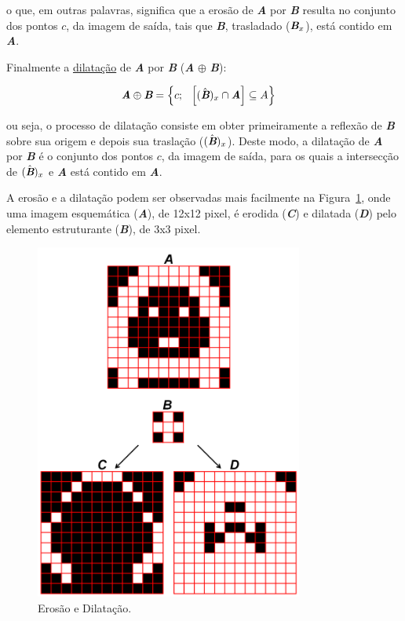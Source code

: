 o que, em outras palavras, significa que a erosão de
\textit{\textbf{A}} por \textit{\textbf{B}} resulta no conjunto dos
pontos $c$, da imagem de saída, tais que \textit{\textbf{B}},
trasladado ($\textit{\textbf{B}}_{x}$), está contido em
\textit{\textbf{A}}.

Finalmente a \underline{dilatação} de \textit{\textbf{A}} por
\textit{\textbf{B}} (\textit{\textbf{A}} $\oplus$
\textit{\textbf{B}}):

\begin{align}
 &\textit{\textbf{A}} \oplus \textit{\textbf{B}} = \left\lbrace \text{$c$; \: $\left[ (\hat{\textit{\textbf{B}}})_{x} \cap \textbf{\textit{A}} \right] \subseteq A$} \right\rbrace
\end{align}

ou seja, o processo de dilatação consiste em obter primeiramente a
reflexão de \textit{\textbf{B}} sobre sua origem e depois sua
traslação ($(\hat{\textit{\textbf{B}}})_{x}$). Deste modo, a dilatação
de \textit{\textbf{A}} por \textit{\textbf{B}} é o conjunto dos pontos
$c$, da imagem de saída, para os quais a intersecção de
$(\hat{\textit{\textbf{B}}})_{x}$ e \textit{\textbf{A}} está contido
em \textit{\textbf{A}}.

A erosão e a dilatação podem ser observadas mais facilmente na
Figura~\ref{fig:eroc-dilat}, onde uma imagem esquemática
(\textit{\textbf{A}}), de 12x12 pixel, é erodida (\textit{\textbf{C}})
e dilatada (\textit{\textbf{D}}) pelo elemento estruturante
(\textit{\textbf{B}}), de 3x3 pixel.

\begin{figure} [h]
  \begin{center}
    \includegraphics[height=334pt,width=250pt]{images/fig_eroc-dilat}
    \caption{Erosão e Dilatação.}\label{fig:eroc-dilat}
  \end{center}
\end{figure}

